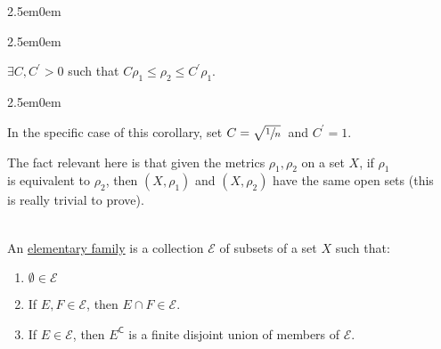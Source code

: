 \documentclass{book}
\newcommand{\hFour}{%
   \color{Cyan!80!black}
   \fontsize{12}{14}\selectfont%
}
\newenvironment{myIndent}{%
   \begin{adjustwidth}{2.5em}{0em}%
}{%
   \end{adjustwidth}%
}
\newcommand{\udefine}[1]{{%
   \setulcolor{Red}%
   \setul{0.14em}{0.07em}%
   \ul{#1}%
}}
\newcommand{\comp}{\mathsf{C}}
\newcommand{\mySepTwo}[1][.]{%
   {\noindent\color{#1}{\rule{6.5in}{0.5mm}}}\\%
}
\newcommand{\retTwo}{\hfill\bigbreak}
\begin{document}
\begin{myIndent}
\begin{myIndent}
      {\centering $\exists C, C^\prime > 0$ such that $C\rho_1 \leq \rho_2 \leq C^\prime\rho_1$.\retTwo\par}

      
      \begin{myIndent}\hFour
         In the specific case of this corollary, set $C = \sqrt{\sfrac{1}{n}}\hspace{0.2em}$ and $C^\prime = 1$.\retTwo
      \end{myIndent}

      The fact relevant here is that given the metrics $\rho_1, \rho_2$ on a set $X$, if $\rho_1$\\ is equivalent to $\rho_2$, then $(X, \rho_1)$ and $(X, \rho_2)$ have the same open sets (this\\ is really trivial to prove).\retTwo
   \end{myIndent}
\end{myIndent}

\mySepTwo

An \udefine{elementary family} is a collection $\mathcal{E}$ of subsets of a set $X$ such that:

\begin{enumerate}
   \item $\emptyset \in \mathcal{E}$
   \item If $E, F \in \mathcal{E}$, then $E \cap F \in \mathcal{E}$.
   \item If $E \in \mathcal{E}$, then $E^\comp$ is a finite disjoint union of members of $\mathcal{E}$.
\end{enumerate}

\newpage
\end{document}
